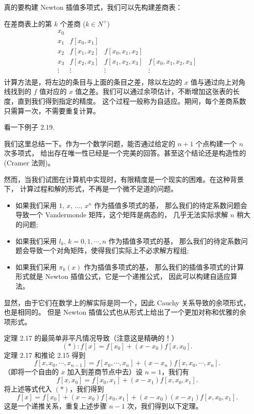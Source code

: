 \documentclass[a4paper]{ctexart}
\begin{document}
真的要构建 Newton 插值多项式，我们可以先构建差商表：

 在差商表上的第 $k$ 个差商 ($k \in N^+$) 
\[
\begin{array}{cccc}
x_0 & & & \\
x_1 & f [x_0, x_1] & & \\
x_2 & f [x_1, x_2] & f [x_0 , x_1, x_2] & \\
x_3 & f [x_2, x_3] & f [x_1 , x_2, x_3] & f [x_0 , x_1 , x_2 , x_3 ] \\
\vdots & \vdots & \vdots & \vdots \\
\end{array}
\]
计算方法是，将左边的条目与上面的条目之差，除以左边的 $x$ 值与通过向上对角线找到的 
$f$ 值对应的 $x$ 值之差。我们可以通过余项估计，不断增加这张表的长度，直到我们得到指定的精度。
这个过程一般称为自适应。期间，每个差商系数只需算一次，不需要重复计算。

看一下例子 2.19.

我们这里总结一下。作为一个数学问题，能否通过给定的 $n + 1$ 个点构建一个 $n$ 次多项式，
给出存在唯一性已经是一个完美的回答。甚至这个结论还是构造性的 (Cramer 法则)。

然而，当我们试图在计算机中实现时，有限精度是一个现实的困难。在这种背景下，
计算过程和解的形式，不再是一个微不足道的问题。

\begin{itemize}
  \item 如果我们采用 $1$, $x$, $\ldots$, $x^n$ 作为插值多项式的基，
  那么我们的待定系数问题会导致一个 Vandermonde 矩阵，这个矩阵是病态的，
  几乎无法实际求解 $n$ 稍大的问题;
  \item 如果我们采用 $l_k$, $k = 0, 1, \cdots, n$ 作为插值多项式的基，
  那么我们的待定系数问题会导致一个对角矩阵，使得我们实际上不必求解方程组;
  \item 如果我们采用 $\pi_k(x)$ 作为插值多项式的基，
  那么我们的插值多项式的计算形式就是 Newton 插值公式，它是一个递推公式，
  因此可以构建自适应算法。
\end{itemize}

显然，由于它们在数学上的解实际是同一个，因此 Cauchy 关系导致的余项形式，也是相同的。
但是 Newton 插值公式也从形式上给出了一个更加对称和优雅的余项形式。

 定理 2.17 的最简单非平凡情况导致（注意这是精确的！）
\[
(\ast) : f [x] = f [x_0 ] + (x - x_0 )f [x, x_0 ].
\]
定理 2.17 和推论 2.15 得到
\[
f [x, x_0 , \cdots , x_{n-1}] = f [x_0 , \cdots , x_n ] + (x - x_n )f [x, x_0 , \cdots , x_n].
\]
（即将一个自由的 $x$ 加入到差商节点中去）设 $n = 1$，我们有
\[
f [x, x_0 ] = f [x_0 , x_1] + (x - x_1 )f [x, x_0 , x_1].
\]
将上述等式代入 $(\ast)$，我们得到
\[
f [x] = f [x_0 ] + (x - x_0 )f [x_0 , x_1 ] + (x - x_0)(x - x_1)f [x, x_0, x_1].
\]
这是一个递推关系，重复上述步骤 $n - 1$ 次，我们得到以下定理。
\end{document}
